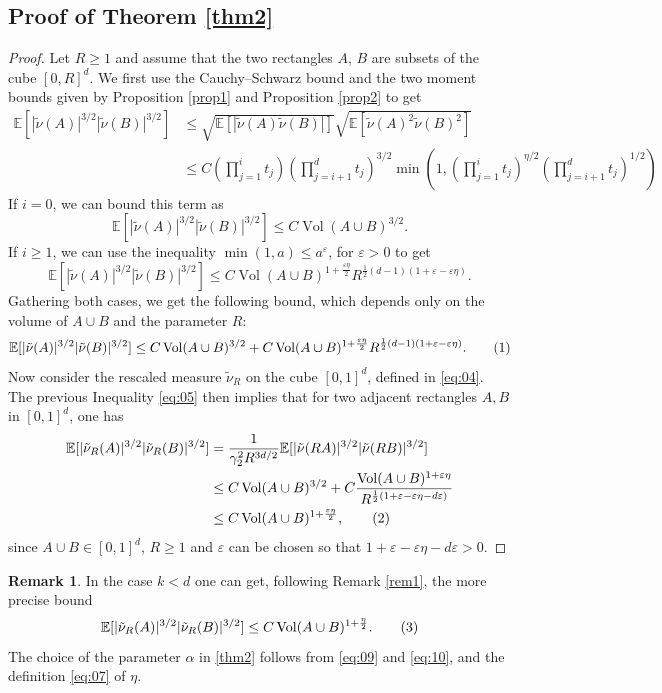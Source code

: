 \documentclass[11pt,a4paper]{article}
\newcommand\E{\mathbb{E}}
\newcommand\nut{\tilde{\nu}}
\DeclareMathOperator\Vol{Vol}
\newcommand\numberthis{\addtocounter{equation}{1}\tag{\theequation}}
\numberwithin{equation}{section}
\theoremstyle{plain}
\theoremstyle{plain}
\theoremstyle{plain}
\theoremstyle{plain}
\theoremstyle{definition}
\theoremstyle{definition}
\newtheorem{remark}[theo]{Remark}
\begin{document}
\subsection{Proof of Theorem \ref{thm2}}
\begin{proof}
Let $R\geq 1$ and assume that the two rectangles $A$, $B$ are subsets of the cube $[0,R]^d$. We first use the Cauchy--Schwarz bound and the two moment bounds given by Proposition \ref{prop1} and Proposition \ref{prop2} to get
\begin{align*}
\E[|\nut(A)|^{3/2}|\nut(B)|^{3/2}]&\leq \sqrt{\E[|\nut(A)\nut(B)|]}\sqrt{\E[\nut(A)^2\nut(B)^2]}\\
&\leq C\left(\prod_{j=1}^i t_j\right)\left(\prod_{j=i+1}^d t_j\right)^{3/2}\min\left(1, \left(\prod_{j=1}^i t_j\right)^{\eta/2}\left(\prod_{j=i+1}^d t_j\right)^{1/2}\right)
\end{align*}
If $i=0$, we can bound this term as 
\[\E[|\nut(A)|^{3/2}|\nut(B)|^{3/2}] \leq C\Vol(A\cup B)^{3/2}.\]
If $i\geq 1$, we can use the inequality $\min(1,a)\leq a^\varepsilon$, for $\varepsilon > 0$ to get
\[\E[|\nut(A)|^{3/2}|\nut(B)|^{3/2}]\leq C\Vol(A\cup B)^{1+\frac{\varepsilon \eta}{2}}R^{\frac{1}{2}(d-1)(1 + \varepsilon - \varepsilon\eta)}.\]
Gathering both cases, we get the following bound, which depends only on the volume of $A\cup B$ and the parameter $R$:
\[\E[|\nut(A)|^{3/2}|\nut(B)|^{3/2}] \leq C\Vol(A\cup B)^{3/2} + C\Vol(A\cup B)^{1+\frac{\varepsilon \eta}{2}}R^{\frac{1}{2}(d-1)(1 + \varepsilon - \varepsilon\eta)}.\numberthis\label{eq:05}\]
Now consider the rescaled measure $\nut_R$ on the cube $[0,1]^d$, defined in \eqref{eq:04}. The previous Inequality \eqref{eq:05} then implies that for two adjacent rectangles $A,B$ in $[0,1]^d$, one has
\begin{align*}
\E[|\nut_R(A)|^{3/2}|\nut_R(B)|^{3/2}]&= \frac{1}{\gamma_2^2R^{3d/2}}\E[|\nut(RA)|^{3/2}|\nut(RB)|^{3/2}]\\
&\leq C\Vol(A\cup B)^{3/2} + C\frac{\Vol(A\cup B)^{1+\varepsilon\eta}}{R^{\frac{1}{2}(1 + \varepsilon - \varepsilon\eta - d\varepsilon)}}\\
&\leq C\Vol(A\cup B)^{1+\frac{\varepsilon\eta}{2}},\numberthis\label{eq:09}
\end{align*}
since $A\cup B\in [0,1]^d$, $R\geq 1$ and $\varepsilon$ can be chosen so that $1 + \varepsilon - \varepsilon\eta - d\varepsilon>0$.
\end{proof}
\begin{remark}
In the case $k<d$ one can get, following Remark \ref{rem1}, the more precise bound
\[\E[|\nut_R(A)|^{3/2}|\nut_R(B)|^{3/2}]\leq C\Vol(A\cup B)^{1+\frac{\eta}{2}}.\numberthis\label{eq:10}\]
The choice of the parameter $\alpha$ in \ref{thm2} follows from \eqref{eq:09} and \eqref{eq:10}, and the definition \eqref{eq:07} of $\eta$.
\end{remark}
%
%
\printbibliography
\end{document}
